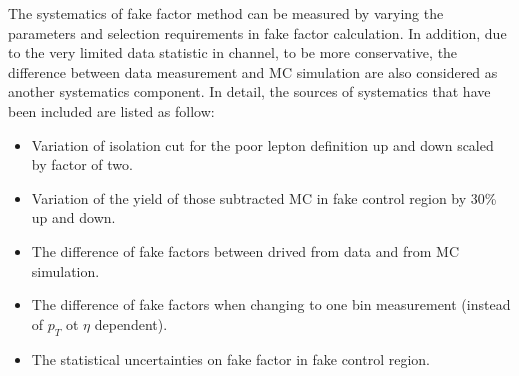 The systematics of fake factor method can be measured by varying the parameters and selection requirements in fake factor calculation.
In addition, due to the very limited data statistic in \llll channel, to be more conservative, 
the difference between data measurement and MC simulation are also considered as another systematics component.
In detail, the sources of systematics that have been included are listed as follow:
\begin{itemize}
	\item Variation of isolation cut for the poor lepton definition up and down scaled by factor of two.
	\item Variation of the yield of those subtracted MC in fake control region by 30\% up and down.
	\item The difference of fake factors between drived from data and from MC simulation.
	\item The difference of fake factors when changing to one bin measurement (instead of $p_{T}$ ot $\eta$ dependent).
	\item The statistical uncertainties on fake factor in fake control region.
\end{itemize}

